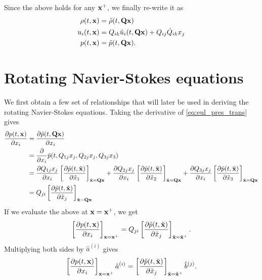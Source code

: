 \documentclass[oneside,a4paper,11pt]{report}
\begin{document}
Since the above holds for any $\mathbf{x}^+$, we finally re-write it as
\begin{align}
    \rho(t,\mathbf{x}) &= \tilde{\rho}(t,\mathbf{Q} \mathbf{x}) \label{eq:eul_rho_trans}\\
    u_i(t,\mathbf{x}) &= Q_{ik} \tilde{u}_i(t,\mathbf{Q} \mathbf{x})  + Q_{ij} \dot{Q}_{ik} x_j \label{eq:eul_vel_trans}\\
    p(t,\mathbf{x}) &= \tilde{p}(t,\mathbf{Q} \mathbf{x}). \label{eq:eul_pres_trans}
\end{align}

\section{Rotating Navier-Stokes equations}
We first obtain a few set of relationships that will later be used in deriving the rotating Navier-Stokes equations. Taking the derivative of \cref{eq:eul_pres_trans} gives
\begin{align}
    \frac{\partial p(t,\mathbf{x})}{\partial x_i} &= \frac{ \partial \tilde{p}(t,\mathbf{Q} \mathbf{x})}{\partial x_i} \nonumber \\
    &= \frac{\partial}{\partial x_i} \tilde{p}(t,Q_{1j}x_j, Q_{2j}x_j, Q_{3j} x_3) \nonumber \\
    &= \frac{\partial Q_{1j}x_j}{\partial x_i} \left [ \frac{\partial \tilde{p}(t,\tilde{\mathbf{x}})}{\partial \tilde{x}_1} \right]_{ \tilde{\mathbf{x}} = \mathbf{Q} \mathbf{x}} + \frac{\partial Q_{2j}x_j}{\partial x_i} \left [ \frac{\partial \tilde{p}(t,\tilde{\mathbf{x}})}{\partial \tilde{x}_2} \right ]_{\tilde{\mathbf{x}} = \mathbf{Q} \mathbf{x}} + \frac{\partial Q_{3j}x_j}{\partial x_i} \left [ \frac{\partial \tilde{p}(t,\tilde{\mathbf{x}})}{\partial \tilde{x}_3} \right ]_{\tilde{\mathbf{x}} = \mathbf{Q} \mathbf{x}} \nonumber \\
    &= Q_{ji} \left [ \frac{\partial \tilde{p}(t,\tilde{\mathbf{x}})}{\partial \tilde{x}_j} \right ]_{\tilde{\mathbf{x}} = \mathbf{Q} \mathbf{x}}
\end{align}
If we evaluate the above at $\mathbf{x} = \mathbf{x}^+$, we get
\begin{equation}
    \left [ \frac{\partial p(t,\mathbf{x})}{\partial x_i} \right]_{\mathbf{x} = \mathbf{x}^+} = Q_{ji} \left [ \frac{\partial \tilde{p}(t,\tilde{\mathbf{x}})}{\partial \tilde{x}_j} \right]_{\tilde{\mathbf{x}} = \tilde{\mathbf{x}}^+}.
\end{equation}
Multiplying both sides by $\hat{a}^{(i)}$ gives
\begin{equation}
\label{eq:ns_pressure_rot_transform}
    \left [ \frac{\partial p(t,\mathbf{x})}{\partial x_i} \right]_{\mathbf{x} = \mathbf{x}^+} \hat{a}^{(i)} = \left [ \frac{\partial \tilde{p}(t,\tilde{\mathbf{x}})}{\partial \tilde{x}_j} \right]_{\tilde{\mathbf{x}} = \tilde{\mathbf{x}}^+} \hat{b}^{(j)}.
\end{equation}
\end{document}
